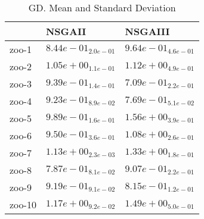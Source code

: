 \documentclass{article}
\begin{document}
\begin{table}
\caption{GD. Mean and Standard Deviation}
\label{table: GD}
\centering
\begin{scriptsize}
\begin{tabular}{lll}
\hline & NSGAII &  NSGAIII\\
\hline 
zoo-1 & \cellcolor{gray95}$  8.44e-01_{ 2.0e-01}$ & \cellcolor{gray25}$  9.64e-01_{ 4.6e-01}$ \\
zoo-2 & \cellcolor{gray95}$  1.05e+00_{ 1.1e-01}$ & \cellcolor{gray25}$  1.12e+00_{ 4.9e-01}$ \\
zoo-3 & \cellcolor{gray25}$  9.39e-01_{ 1.4e-01}$ & \cellcolor{gray95}$  7.09e-01_{ 2.2e-01}$ \\
zoo-4 & \cellcolor{gray25}$  9.23e-01_{ 8.9e-02}$ & \cellcolor{gray95}$  7.69e-01_{ 5.1e-02}$ \\
zoo-5 & \cellcolor{gray95}$  9.89e-01_{ 1.6e-01}$ & \cellcolor{gray25}$  1.56e+00_{ 3.9e-01}$ \\
zoo-6 & \cellcolor{gray95}$  9.50e-01_{ 3.6e-01}$ & \cellcolor{gray25}$  1.08e+00_{ 2.6e-01}$ \\
zoo-7 & \cellcolor{gray95}$  1.13e+00_{ 2.3e-03}$ & \cellcolor{gray25}$  1.33e+00_{ 1.8e-01}$ \\
zoo-8 & \cellcolor{gray95}$  7.87e-01_{ 8.1e-02}$ & \cellcolor{gray25}$  9.07e-01_{ 2.2e-01}$ \\
zoo-9 & \cellcolor{gray25}$  9.19e-01_{ 9.1e-02}$ & \cellcolor{gray95}$  8.15e-01_{ 1.2e-01}$ \\
zoo-10 & \cellcolor{gray95}$  1.17e+00_{ 9.2e-02}$ & \cellcolor{gray25}$  1.49e+00_{ 5.0e-01}$ \\
\hline
\end{tabular}
\end{scriptsize}
\end{table}
\end{document}
